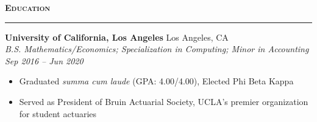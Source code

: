 \documentclass[11pt,letterpaper]{article}
\newcommand{\sectline}{\vspace{5pt}\hrule height 1.5pt\vspace{5pt}}
\newcommand{\sectspace}{\vspace{9pt}}
\newcommand{\smallspace}{\vspace{6pt}}
\newcommand{\heading}[1]{{\fontsize{12pt}{13pt} {\textbf{\textsc{#1}}}}}
\begin{document}
\sectspace

\heading{Education}\sectline
\textbf{University of California, Los Angeles} \hfill Los Angeles, CA \\
\textit{B.S. Mathematics/Economics; Specialization in Computing; Minor in Accounting} \hfill \textit{Sep 2016 -- Jun 2020}
\begin{itemize}
	\item Graduated \textit{summa cum laude} (GPA: 4.00/4.00), Elected Phi Beta Kappa%
	\item Served as President of Bruin Actuarial Society, UCLA's premier organization for student actuaries 
\end{itemize}
\sectspace

\end{document}
